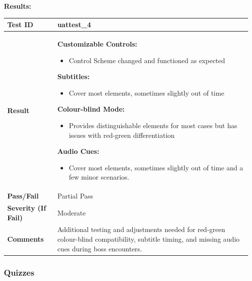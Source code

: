 \documentclass[11pt, a4paper]{article}
\begin{document}
\newpage

\noindent \textbf{Results:}

\begin{center}
\begin{tabularx}{\linewidth}{|>{\raggedright\arraybackslash}m{4cm}|X|}
    \hline
    \textbf{Test ID} & uattest\_4 \\
    \hline
    \textbf{Result} &
    \textbf{Customizable Controls:}
    \begin{itemize}
        \item Control Scheme changed and functioned as expected
    \end{itemize}
    \textbf{Subtitles:}
    \begin{itemize}
        \item Cover most elements, sometimes slightly out of time
    \end{itemize}
    \textbf{Colour-blind Mode:}
    \begin{itemize}
        \item Provides distinguishable elements for most cases but has issues with red-green differentiation
    \end{itemize}
    \textbf{Audio Cues:}
    \begin{itemize}
        \item Cover most elements, sometimes slightly out of time and a few minor scenarios.
    \end{itemize}
    \\
    \hline
    \textbf{Pass/Fail} & Partial Pass \\
    \hline
    \textbf{Severity (If Fail)} & Moderate \\
    \hline
    \textbf{Comments} & Additional testing and adjustments needed for red-green colour-blind compatibility, subtitle timing, and missing audio cues during boss encounters. \\
    \hline
\end{tabularx}
\end{center}

\newpage

\subsubsection{Quizzes}
\end{document}
